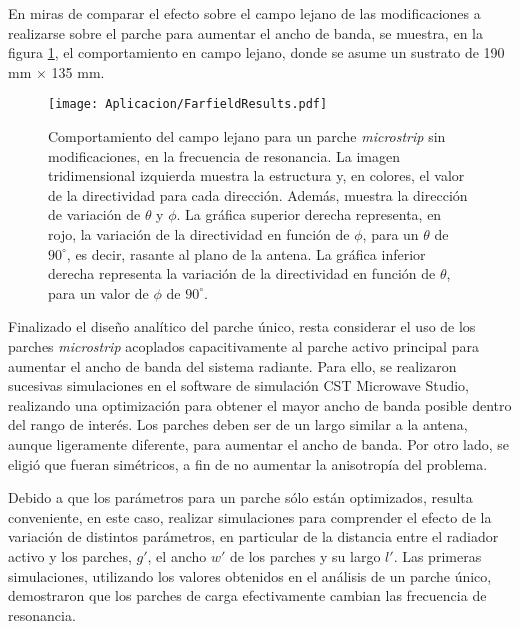 En miras de comparar el efecto sobre el campo lejano de las modificaciones a realizarse sobre el parche para aumentar el ancho de banda, se muestra, en la figura \ref{fig:farfield-1parche-sincarga-sinebg}, el comportamiento en campo lejano, donde se asume un sustrato de 190 mm $\times$ 135 mm.

\begin{figure}[h]
	\centering
	\texttt{[image: Aplicacion/FarfieldResults.pdf]}
	\caption{Comportamiento del campo lejano para un parche \textit{microstrip} sin modificaciones, en la frecuencia de resonancia. La imagen tridimensional izquierda muestra la estructura y, en colores, el valor de la directividad para cada dirección. Además, muestra la dirección de variación de $\theta$ y $\phi$. La gráfica superior derecha representa, en rojo, la variación de la directividad en función de $\phi$, para un $\theta$ de $90^{\circ}$, es decir, rasante al plano de la antena. La gráfica inferior derecha representa la variación de la directividad en función de $\theta$, para un valor de $\phi$ de $90^{\circ}$.}
	\label{fig:farfield-1parche-sincarga-sinebg}
\end{figure}

Finalizado el diseño analítico del parche único, resta considerar el uso de los parches \textit{microstrip} acoplados capacitivamente al parche activo principal para aumentar el ancho de banda del sistema radiante. Para ello, se realizaron sucesivas simulaciones en el software de simulación CST Microwave Studio, realizando una optimización para obtener el mayor ancho de banda posible dentro del rango de interés. Los parches deben ser de un largo similar a la antena, aunque ligeramente diferente, para aumentar el ancho de banda. Por otro lado, se eligió que fueran simétricos, a fin de no aumentar la anisotropía del problema.

Debido a que los parámetros para un parche sólo están optimizados, resulta conveniente, en este caso, realizar simulaciones para comprender el efecto de la variación de distintos parámetros, en particular de la distancia entre el radiador activo y los parches, $g'$, el ancho $w'$ de los parches y su largo $l'$. Las primeras simulaciones, utilizando los valores obtenidos en el análisis de un parche único, demostraron que los parches de carga efectivamente cambian las frecuencia de resonancia. 

